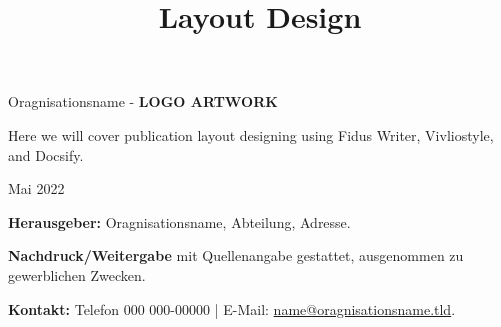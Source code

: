\documentclass{article}
\begin{document}
\title{Layout Design}

\maketitle


Oragnisationsname - \textbf{LOGO ARTWORK}


Here we will cover publication layout designing using Fidus Writer, Vivliostyle, and Docsify.


Mai 2022


\textbf{Herausgeber:} Oragnisationsname, Abteilung, Adresse.


\textbf{Nachdruck/Weitergabe} mit Quellenangabe gestattet, ausgenommen zu gewerblichen Zwecken.


\textbf{Kontakt:} Telefon 000 000-00000 | E-Mail: \href{name@oragnisationsname.tld}{name@oragnisationsname.tld}.
\end{document}
